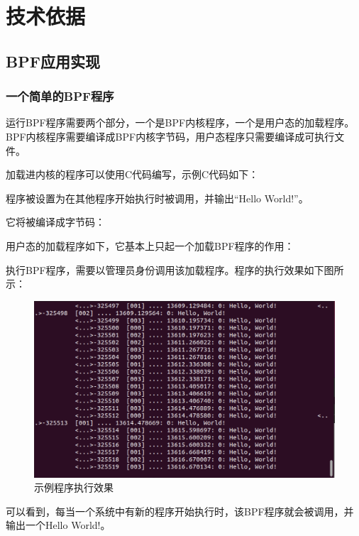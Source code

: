 \documentclass[AutoFakeBold,a4paper]{ctexart}
\begin{document}
\section{技术依据}

\subsection{BPF应用实现}

\subsubsection{一个简单的BPF程序}

运行BPF程序需要两个部分，一个是BPF内核程序，一个是用户态的加载程序。
BPF内核程序需要编译成BPF内核字节码，用户态程序只需要编译成可执行文件。\cite{calavera2019linux}

加载进内核的程序可以使用C代码编写，示例C代码如下：



程序被设置为在其他程序开始执行时被调用，并输出“Hello World!”。

它将被编译成字节码：



用户态的加载程序如下，它基本上只起一个加载BPF程序的作用：



执行BPF程序，需要以管理员身份调用该加载程序。程序的执行效果如下图所示：

\begin{figure}[H]
    \centering
    \includegraphics[width=0.7\columnwidth]{hello_world/test1.png}
    \caption{示例程序执行效果}
\end{figure}

可以看到，每当一个系统中有新的程序开始执行时，该BPF程序就会被调用，并输出一个{\ttfamily Hello World!}。
\end{document}
